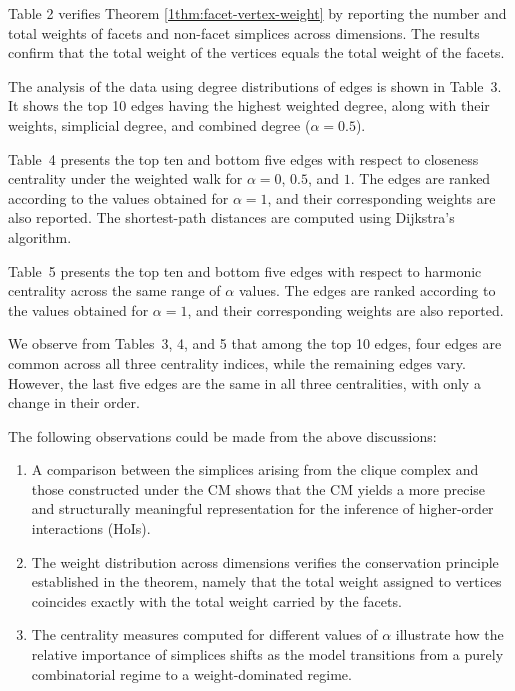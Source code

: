 \documentclass[12pt]{article}
\theoremstyle{normalhead_nobrackets}
\theoremstyle{exampstyle}
\begin{document}
Table 2 verifies Theorem \ref{1thm:facet-vertex-weight} by reporting the number and total weights of facets and non-facet simplices across dimensions. The results confirm that the total weight of the vertices equals the total weight of the facets.

The analysis of the data using degree distributions of edges is shown in Table~3. It shows the top 10 edges having the highest weighted degree, along with their weights, simplicial degree, and combined degree ($\alpha = 0.5$).




Table~4 presents the top ten and bottom five edges with respect to closeness centrality under the weighted walk for $\alpha = 0$, $0.5$, and $1$. The edges are ranked according to the values obtained for $\alpha = 1$, and their corresponding weights are also reported. The shortest-path distances are computed using Dijkstra's algorithm.


Table~5 presents the top ten and bottom five edges with respect to harmonic centrality across the same range of $\alpha$ values. The edges are ranked according to the values obtained for $\alpha = 1$, and their corresponding weights are also reported.

We observe from Tables~3, 4, and 5 that among the top 10 edges, four edges are common across all three centrality indices, while the remaining edges vary. However, the last five edges are the same in all three centralities, with only a change in their order.

The following observations could be made from the above discussions:

\begin{enumerate}
    \item[(i)] A comparison between the simplices arising from the clique complex and those constructed under the CM shows that the CM yields a more precise and structurally meaningful representation for the inference of higher-order interactions (HoIs).

    \item[(ii)] The weight distribution across dimensions verifies the conservation principle established in the theorem, namely that the total weight assigned to vertices coincides exactly with the total weight carried by the facets.

    \item[(iii)] The centrality measures computed for different values of $\alpha$ illustrate how the relative importance of simplices shifts as the model transitions from a purely combinatorial regime to a weight-dominated regime.
\end{enumerate}
\end{document}
